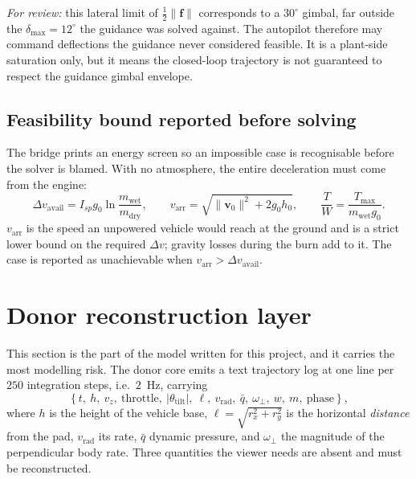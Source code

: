 \documentclass[11pt,a4paper]{article}
\newcommand{\vect}[1]{\mathbf{#1}}
\begin{document}
\emph{For review:} this lateral limit of $\tfrac{1}{2}\lVert\vect{f}\rVert$
corresponds to a $30^\circ$ gimbal, far outside the $\delta_{\max}=12^\circ$ the
guidance was solved against. The autopilot therefore may command deflections the
guidance never considered feasible. It is a plant-side saturation only, but it
means the closed-loop trajectory is not guaranteed to respect the guidance
gimbal envelope.

\subsection{Feasibility bound reported before solving}

The bridge prints an energy screen so an impossible case is recognisable before
the solver is blamed. With no atmosphere, the entire deceleration must come from
the engine:
\begin{equation}
\Delta v_{\mathrm{avail}} = I_{sp} g_0 \ln\frac{m_{\mathrm{wet}}}{m_{\mathrm{dry}}},
\qquad
v_{\mathrm{arr}} = \sqrt{\lVert\vect{v}_0\rVert^2 + 2 g_0 h_0},
\qquad
\frac{T}{W} = \frac{T_{\max}}{m_{\mathrm{wet}} g_0}.
\end{equation}
$v_{\mathrm{arr}}$ is the speed an unpowered vehicle would reach at the ground
and is a strict lower bound on the required $\Delta v$; gravity losses during the
burn add to it. The case is reported as unachievable when
$v_{\mathrm{arr}}>\Delta v_{\mathrm{avail}}$.

\section{Donor reconstruction layer}
\label{sec:donor}

This section is the part of the model written for this project, and it carries
the most modelling risk. The donor core emits a text trajectory log at one line
per $250$ integration steps, i.e.\ $2$~Hz, carrying
\begin{equation}
\left\{t,\ h,\ v_z,\ \text{throttle},\ \lvert\theta_{\mathrm{tilt}}\rvert,\
 \ell,\ v_{\mathrm{rad}},\ \bar q,\ \omega_\perp,\ w,\ m,\ \text{phase}\right\},
\end{equation}
where $h$ is the height of the vehicle base, $\ell=\sqrt{r_x^2+r_y^2}$ is the
horizontal \emph{distance} from the pad, $v_{\mathrm{rad}}$ its rate, $\bar q$
dynamic pressure, and $\omega_\perp$ the magnitude of the perpendicular body
rate. Three quantities the viewer needs are absent and must be reconstructed.
\end{document}
